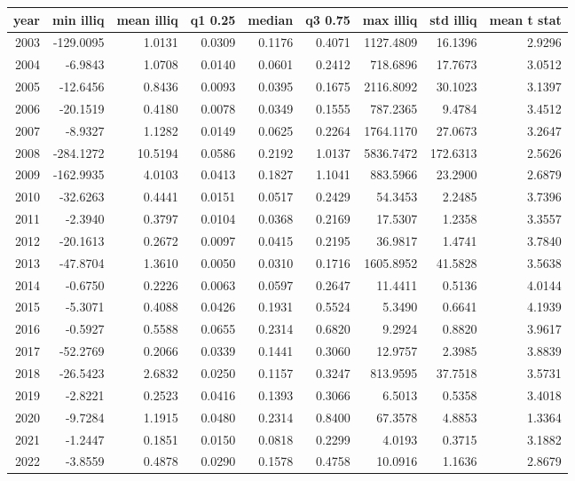 \begin{tabular}{rrrrrrrrr}
\toprule
year & min illiq & mean illiq & q1 0.25 & median & q3 0.75 & max illiq & std illiq & mean t stat \\
\midrule
2003 & -129.0095 & 1.0131 & 0.0309 & 0.1176 & 0.4071 & 1127.4809 & 16.1396 & 2.9296 \\
2004 & -6.9843 & 1.0708 & 0.0140 & 0.0601 & 0.2412 & 718.6896 & 17.7673 & 3.0512 \\
2005 & -12.6456 & 0.8436 & 0.0093 & 0.0395 & 0.1675 & 2116.8092 & 30.1023 & 3.1397 \\
2006 & -20.1519 & 0.4180 & 0.0078 & 0.0349 & 0.1555 & 787.2365 & 9.4784 & 3.4512 \\
2007 & -8.9327 & 1.1282 & 0.0149 & 0.0625 & 0.2264 & 1764.1170 & 27.0673 & 3.2647 \\
2008 & -284.1272 & 10.5194 & 0.0586 & 0.2192 & 1.0137 & 5836.7472 & 172.6313 & 2.5626 \\
2009 & -162.9935 & 4.0103 & 0.0413 & 0.1827 & 1.1041 & 883.5966 & 23.2900 & 2.6879 \\
2010 & -32.6263 & 0.4441 & 0.0151 & 0.0517 & 0.2429 & 54.3453 & 2.2485 & 3.7396 \\
2011 & -2.3940 & 0.3797 & 0.0104 & 0.0368 & 0.2169 & 17.5307 & 1.2358 & 3.3557 \\
2012 & -20.1613 & 0.2672 & 0.0097 & 0.0415 & 0.2195 & 36.9817 & 1.4741 & 3.7840 \\
2013 & -47.8704 & 1.3610 & 0.0050 & 0.0310 & 0.1716 & 1605.8952 & 41.5828 & 3.5638 \\
2014 & -0.6750 & 0.2226 & 0.0063 & 0.0597 & 0.2647 & 11.4411 & 0.5136 & 4.0144 \\
2015 & -5.3071 & 0.4088 & 0.0426 & 0.1931 & 0.5524 & 5.3490 & 0.6641 & 4.1939 \\
2016 & -0.5927 & 0.5588 & 0.0655 & 0.2314 & 0.6820 & 9.2924 & 0.8820 & 3.9617 \\
2017 & -52.2769 & 0.2066 & 0.0339 & 0.1441 & 0.3060 & 12.9757 & 2.3985 & 3.8839 \\
2018 & -26.5423 & 2.6832 & 0.0250 & 0.1157 & 0.3247 & 813.9595 & 37.7518 & 3.5731 \\
2019 & -2.8221 & 0.2523 & 0.0416 & 0.1393 & 0.3066 & 6.5013 & 0.5358 & 3.4018 \\
2020 & -9.7284 & 1.1915 & 0.0480 & 0.2314 & 0.8400 & 67.3578 & 4.8853 & 1.3364 \\
2021 & -1.2447 & 0.1851 & 0.0150 & 0.0818 & 0.2299 & 4.0193 & 0.3715 & 3.1882 \\
2022 & -3.8559 & 0.4878 & 0.0290 & 0.1578 & 0.4758 & 10.0916 & 1.1636 & 2.8679 \\
\bottomrule
\end{tabular}
